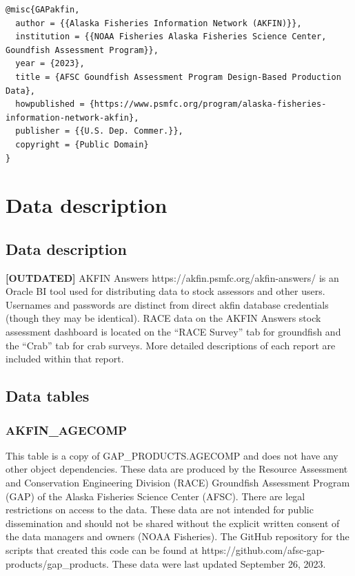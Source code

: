 \documentclass[
  letterpaper,
  oneside,
  open=any]{scrbook}
\begin{document}
\begin{verbatim}
@misc{GAPakfin,
  author = {{Alaska Fisheries Information Network (AKFIN)}}, 
  institution = {{NOAA Fisheries Alaska Fisheries Science Center, Goundfish Assessment Program}},
  year = {2023}, 
  title = {AFSC Goundfish Assessment Program Design-Based Production Data},
  howpublished = {https://www.psmfc.org/program/alaska-fisheries-information-network-akfin},
  publisher = {{U.S. Dep. Commer.}},
  copyright = {Public Domain} 
}
\end{verbatim}

\hypertarget{data-description-2}{%
\chapter{Data description}\label{data-description-2}}

\hypertarget{data-description-3}{%
\section{Data description}\label{data-description-3}}

\textbf{{[}OUTDATED{]}} AKFIN Answers
https://akfin.psmfc.org/akfin-answers/ is an Oracle BI tool used for
distributing data to stock assessors and other users. Usernames and
passwords are distinct from direct akfin database credentials (though
they may be identical). RACE data on the AKFIN Answers stock assessment
dashboard is located on the ``RACE Survey'' tab for groundfish and the
``Crab'' tab for crab surveys. More detailed descriptions of each report
are included within that report.

\hypertarget{data-tables-1}{%
\section{Data tables}\label{data-tables-1}}

\hypertarget{akfin_agecomp}{%
\subsection{AKFIN\_AGECOMP}\label{akfin_agecomp}}

This table is a copy of GAP\_PRODUCTS.AGECOMP and does not have any
other object dependencies. These data are produced by the Resource
Assessment and Conservation Engineering Division (RACE) Groundfish
Assessment Program (GAP) of the Alaska Fisheries Science Center (AFSC).
There are legal restrictions on access to the data. These data are not
intended for public dissemination and should not be shared without the
explicit written consent of the data managers and owners (NOAA
Fisheries). The GitHub repository for the scripts that created this code
can be found at https://github.com/afsc-gap-products/gap\_products.
These data were last updated September 26, 2023.
\end{document}
